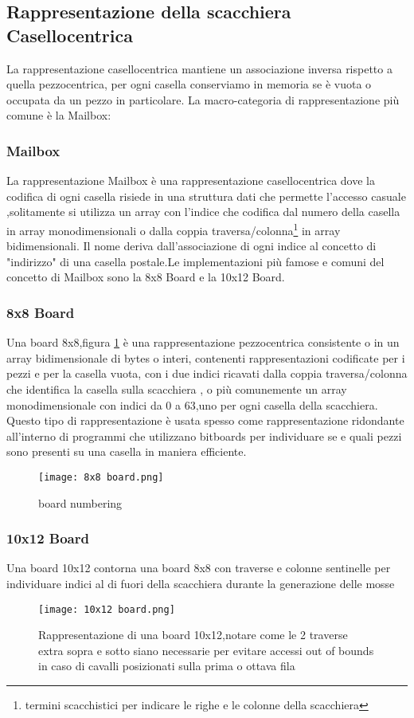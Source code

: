 \vfill
\clearpage


\subsection{Rappresentazione della scacchiera Casellocentrica}
La rappresentazione casellocentrica  mantiene un associazione inversa rispetto a quella pezzocentrica,
per ogni casella conserviamo in memoria se è vuota o occupata da un pezzo in particolare.
La macro-categoria di  rappresentazione più comune è la Mailbox:

\subsubsection{Mailbox}
La rappresentazione Mailbox è una rappresentazione casellocentrica dove la codifica di ogni casella risiede in una struttura dati
che permette l'accesso casuale ,solitamente si utilizza un array con l'indice che codifica dal numero della casella in array monodimensionali
o dalla coppia traversa/colonna\footnote{termini scacchistici per indicare le righe e le colonne della scacchiera} in array bidimensionali.
Il nome deriva dall'associazione di ogni indice al concetto di "indirizzo" di una casella postale.Le implementazioni più famose e
comuni del concetto di Mailbox sono la 8x8 Board e la 10x12 Board.

\subsubsection{8x8 Board}
Una board 8x8,figura \ref{otto} è una rappresentazione pezzocentrica consistente o in un array bidimensionale di bytes o interi, contenenti rappresentazioni codificate
per i pezzi e per la casella vuota, con i due indici ricavati dalla coppia traversa/colonna che identifica la casella sulla scacchiera ,
o più comunemente un array monodimensionale con indici da 0 a 63,uno per ogni casella della scacchiera.
Questo tipo di rappresentazione è usata spesso come rappresentazione ridondante all'interno di programmi che utilizzano bitboards
per individuare se e quali pezzi sono presenti su una casella in maniera efficiente.
\begin{figure}[!ht]
    \centering
    \texttt{[image: 8x8 board.png]}
    \caption{board numbering}
    \label{otto}
\end{figure}

\subsubsection{10x12 Board}
Una board 10x12  contorna una  board 8x8   con traverse e colonne sentinelle  per individuare  indici al di fuori della scacchiera durante la generazione delle mosse
\vfill
\begin{figure}[!ht]
    \centering
    \texttt{[image: 10x12 board.png]}
    \caption{Rappresentazione di una board 10x12,notare come le 2 traverse extra sopra e sotto siano necessarie per evitare accessi out of bounds in caso di cavalli posizionati sulla prima o ottava fila }
\end{figure}
\vfill
\clearpage


